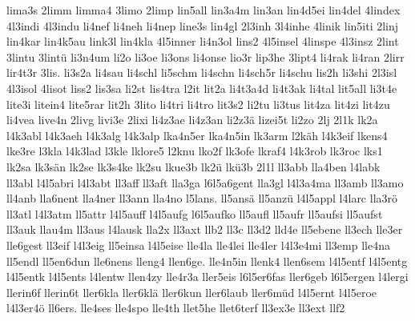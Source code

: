 {    lima3s
    2limm
    limma4
    3limo
    2limp
    lin5all
    lin3a4m
    lin3an
    lin4d5ei
    lin4del
    4lindex
    4l3indi
    4l3indu
    li4nef
    li4neh
    li4nep
    line3s
    lin4gl
    2l3inh
    3l4inhe
    4linik
    lin5iti
    2linj
    lin4kar
    lin4k5au
    link3l
    lin4kla
    4l5inner
    li4n3ol
    lins2
    4l5insel
    4linspe
    4l3insz
    2lint
    3lintu
    3lintü
    li3n4um
    li2o
    li3oe
    li3ons
    li4onse
    lio3r
    lip3he
    3lipt4
    li4rak
    li4ran
    2lirr
    lir4t3r
    3lis.
    li3s2a
    li4sau
    li4schl
    li5schm
    li4schn
    li4sch5r
    li4schu
    lis2h
    li3shi
    2l3isl
    4l3isol
    4lisot
    liss2
    lis3sa
    li2st
    lis4tra
    l2it
    lit2a
    li4t3a4d
    li4t3ak
    li4tal
    lit5all
    li3t4e
    lite3i
    litein4
    lite5rar
    lit2h
    3lito
    li4tri
    li4tro
    lit3s2
    li2tu
    li3tus
    lit4za
    lit4zi
    lit4zu
    li4vea
    live4n
    2livg
    livi3e
    2lixi
    li4z3ae
    li4z3an
    li2z3ä
    lizei5t
    li2zo
    2lj
    2l1k
    lk2a
    l4k3abl
    l4k3aeh
    l4k3alg
    l4k3alp
    lka4n5er
    lka4n5in
    lk3arm
    l2käh
    l4k3eif
    lkens4
    lke3re
    l3kla
    l4k3lad
    l3kle
    lklore5
    l2knu
    lko2f
    lk3ofe
    lkraf4
    l4k3rob
    lk3roc
    lks1
    lk2sa
    lk3sän
    lk2se
    lk3s4ke
    lk2su
    lkue3b
    lk2ü
    lkü3b
    2l1l
    ll3abb
    lla4ben
    l4labk
    ll3abl
    l4l5abri
    l4l3abt
    ll3aff
    ll3aft
    lla3ga
    l6l5a6gent
    lla3gl
    l4l3a4ma
    ll3amb
    ll3amo
    ll4anb
    lla6nent
    lla4ner
    ll3ann
    lla4no
    l5lans.
    ll5ansä
    ll5anzü
    l4l5appl
    l4larc
    lla3rö
    ll3atl
    l4l3atm
    ll5attr
    l4l5auff
    l4l5aufg
    l6l5aufko
    ll5aufl
    ll5aufr
    ll5aufsi
    ll5aufst
    ll3auk
    llau4m
    ll3aus
    l4lausk
    lla2x
    ll3axt
    llb2
    ll3c
    ll3d2
    lld4e
    ll5ebene
    ll3ech
    lle3er
    lle6gest
    ll3eif
    l4l3eig
    ll5einsa
    l4l5eise
    lle4la
    lle4lei
    lle4ler
    l4l3e4mi
    ll3emp
    lle4na
    ll5endl
    ll5en6dun
    lle6nens
    lleng4
    llen6ge.
    lle4n5in
    llenk4
    llen6sem
    l4l5entf
    l4l5entg
    l4l5entk
    l4l5ents
    l4lentw
    llen4zy
    lle4r3a
    ller5eis
    l6l5er6fas
    ller6geb
    l6l5ergen
    l4lergi
    llerin6f
    llerin6t
    ller6kla
    ller6klä
    ller6kun
    ller6laub
    ller6müd
    l4l5ernt
    l4l5eroe
    l4l3er4ö
    ll6ers.
    lle4ses
    lle4spo
    lle4th
    llet5he
    llet6terf
    ll3ex3e
    ll3ext
    llf2
}
